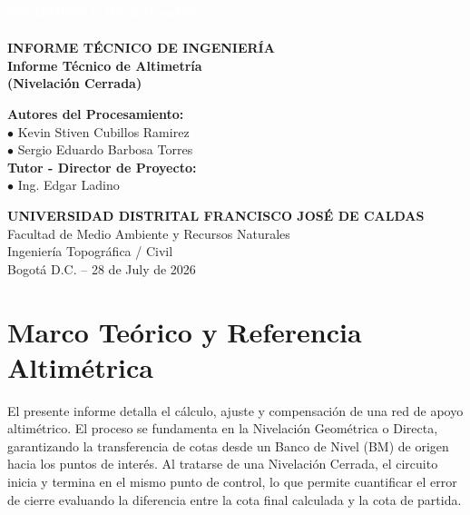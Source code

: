 \documentclass[11pt,letterpaper]{article}
\begin{document}
\begin{titlepage}
\vspace*{-2cm}
\begin{center}
  \textcolor{white}{\Huge \textbf{GEOPORTAL WEB (GeoPol)}} \\[0.5cm]
  \textcolor{white}{\large \textit{''Máxima precisión al alcance de tus manos''}} \\[2cm]
  \vspace{3cm}
  {\LARGE \textbf{INFORME TÉCNICO DE INGENIERÍA}} \\[0.5cm]
  {\Large \textbf{Informe Técnico de Altimetría\\ (Nivelación Cerrada)}} \\[2cm]
  \begin{flushleft}
    \Large \textbf{Autores del Procesamiento:}\\[0.2cm]
    \large $\bullet$ Kevin Stiven Cubillos Ramirez \\[0.1cm]
    \large $\bullet$ Sergio Eduardo Barbosa Torres \\[0.1cm]
    \vspace{1cm}
    \Large \textbf{Tutor - Director de Proyecto:}\\[0.2cm]
    \large $\bullet$ Ing. Edgar Ladino
  \end{flushleft}
  \vfill
  \textbf{UNIVERSIDAD DISTRITAL FRANCISCO JOSÉ DE CALDAS}\\[0.2cm]
  Facultad de Medio Ambiente y Recursos Naturales \\ Ingeniería Topográfica / Civil \\[0.2cm]
  Bogotá D.C. -- 28 de July de 2026
\end{center}
\end{titlepage}
\tableofcontents
\newpage
\section{Marco Teórico y Referencia Altimétrica}
El presente informe detalla el cálculo, ajuste y compensación de una red de apoyo altimétrico. El proceso se fundamenta en la Nivelación Geométrica o Directa, garantizando la transferencia de cotas desde un Banco de Nivel (BM) de origen hacia los puntos de interés.
Al tratarse de una Nivelación Cerrada, el circuito inicia y termina en el mismo punto de control, lo que permite cuantificar el error de cierre evaluando la diferencia entre la cota final calculada y la cota de partida.
\end{document}
